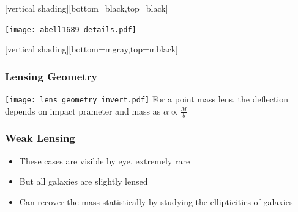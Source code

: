 \documentclass{beamer}
\begin{document}
{
    [vertical shading][bottom=black,top=black]

    \frame
    {
        \begin{center}
            \texttt{[image: abell1689-details.pdf]}
        \end{center}
    }

    [vertical shading][bottom=mgray,top=mblack]

}


\frame
{
    \frametitle{Lensing Geometry}

    \begin{center}
        \texttt{[image: lens\_geometry\_invert.pdf]}
        \newline
        For a point mass lens, the deflection depends on impact
        prameter and mass as
        \newline
        {\huge {\color{gold} $\alpha \propto \frac{M}{b}$ }}
    \end{center}
}

\frame
{
    \frametitle{Weak Lensing}

 
    \begin{itemize}

        \item These cases are visible by eye, extremely rare

        \item But all galaxies are slightly lensed

        \item Can recover the mass statistically by studying
            the ellipticities of galaxies


    \end{itemize}

}
\end{document}

